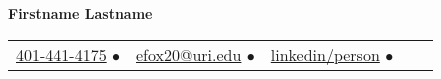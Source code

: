 \documentclass{article}
\begin{document}
    \fontsize{9}{15}
    \selectfont
    \begin{center}
        \begin{center}
            \Huge\bfseries Firstname Lastname
        \end{center}
            \begin{tabular}{c c c c c}
                \href{tel:Phone-Number}{401-441-4175} $\bullet$ & 
                \href{mailto:mailid@mail.com}{efox20@uri.edu} $\bullet$ & 
                \href{https://www.linkedin.com/in/person/}{linkedin/person} $\bullet$ & 
        \end{tabular}
    \end{center}    
    \vspace{-0.75em}
    
    
    
    
    
  
\end{document}
